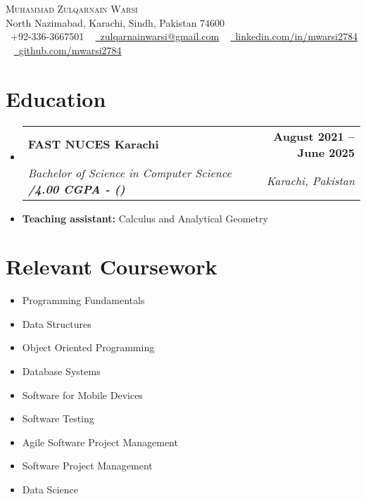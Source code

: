 \documentclass[letterpaper,11pt]{article}
\makeatletter
\newcommand{\resumeItem}[1]{
  \item\small{
    {#1 \vspace{-2pt}}
  }
}
\newcommand{\resumeSubheading}[4]{
  \vspace{-2pt}\item
    \begin{tabular*}{1.0\textwidth}[t]{l@{\extracolsep{\fill}}r}
      \textbf{#1} & \textbf{\small #2} \\
      \textit{\small#3} & \textit{\small #4} \\
    \end{tabular*}\vspace{-7pt}
}
\newcommand{\resumeSubHeadingListStart}{\begin{itemize}[leftmargin=0.0in, label={}]}
\newcommand{\resumeSubHeadingListEnd}{\end{itemize}}
\makeatother
\begin{document}
\begin{center}
    {\Huge \scshape Muhammad Zulqarnain Warsi} \\ \vspace{1pt}
    North Nazimabad, Karachi, Sindh, Pakistan 74600 \\ \vspace{1pt}
    \small \raisebox{-0.1\height}\faPhone\ +92-336-3667501 ~ \href{mailto:zulqarnainwarsi@gmail.com}{\raisebox{-0.2\height}\faEnvelope\  \underline{zulqarnainwarsi@gmail.com}} ~ 
    \href{https://linkedin.com/in/mwarsi2784/}{\raisebox{-0.2\height}\faLinkedin\ \underline{linkedin.com/in/mwarsi2784}}  ~
    \href{https://github.com/mwarsi2784}{\raisebox{-0.2\height}\faGithub\ \underline{github.com/mwarsi2784}}
    \vspace{-8pt}
\end{center}



\section{Education}
  \resumeSubHeadingListStart
    \resumeSubheading
      {FAST NUCES Karachi}{August 2021 -- June 2025}
      {Bachelor of Science in Computer Science \textbf{ \cgpa/4.00 CGPA - (\percentage)}}{Karachi, Pakistan}
      \resumeItem{\textbf{Teaching assistant:} Calculus and Analytical Geometry}
  \resumeSubHeadingListEnd



\section{Relevant Coursework}
    \begin{multicols}{3}
        \begin{itemize}[itemsep=-5pt, parsep=3pt]
            \item \small Programming Fundamentals
            \item \small Data Structures
            \item \small Object Oriented Programming
            \item \small Database Systems	
            \item \small Software for Mobile Devices
            \item \small Software Testing
            \item \small Agile Software Project Management
            \item \small Software Project Management
            \item \small Data Science
        \end{itemize}
    \end{multicols}
    \vspace*{2.0\multicolsep}
\end{document}
